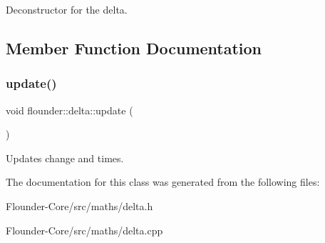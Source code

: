 Deconstructor for the delta. 



\subsection{Member Function Documentation}
\mbox{\label{classflounder_1_1delta_a6f87fd0b76d229ec490a07a565c2afd0}} 
\subsubsection{\texorpdfstring{update()}{update()}}
{\footnotesize\ttfamily void flounder\+::delta\+::update (\begin{DoxyParamCaption}{ }\end{DoxyParamCaption})}



Updates change and times. 



The documentation for this class was generated from the following files\+:\begin{DoxyCompactItemize}
\item 
Flounder-\/\+Core/src/maths/delta.\+h\item 
Flounder-\/\+Core/src/maths/delta.\+cpp\end{DoxyCompactItemize}

